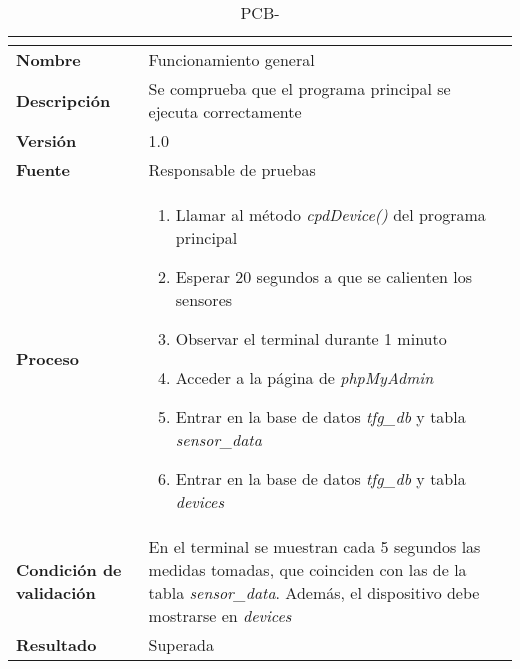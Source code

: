 \begin{table}[H]
	\caption{PCB-\number\pcb}
	\begin{tabular}{|l|p{}|}
		\hline
		\multicolumn{2}{|c|}{\cellcolor[HTML]{BFBFBF}{\color[HTML]{000000} \textbf{PCB-\number\pcb}}} \\ \hline
		\textbf{Nombre}                  & Funcionamiento general                                                                                                                                                            \\ \hline
		\textbf{Descripción}             & Se comprueba que el programa principal se ejecuta correctamente                                                                                                                      \\ \hline
		\textbf{Versión}                 & 1.0                                                                                                                                                                               \\ \hline
		\textbf{Fuente}                  & Responsable de pruebas                                                                                                                                                            \\ \hline
		\textbf{Proceso}                 & \begin{enumerate}
			\item Llamar al método \textit{cpdDevice()} del programa principal
			\item Esperar 20 segundos a que se calienten los sensores
			\item Observar el terminal durante 1 minuto
			\item Acceder a la página de \textit{phpMyAdmin}
			\item Entrar en la base de datos \textit{tfg\_db} y tabla \textit{sensor\_data}
			\item Entrar en la base de datos \textit{tfg\_db} y tabla \textit{devices}
		\end{enumerate}                                                                                                                                                        \\ \hline
		\textbf{Condición de validación} & En el terminal se muestran cada 5 segundos las medidas tomadas, que coinciden con las de la tabla \textit{sensor\_data}. Además, el dispositivo debe mostrarse en \textit{devices} \\ \hline
		\textbf{Resultado}               & Superada                                                                                                                                                                          \\ \hline
	\end{tabular}
\end{table}
\vspace{-1cm}

